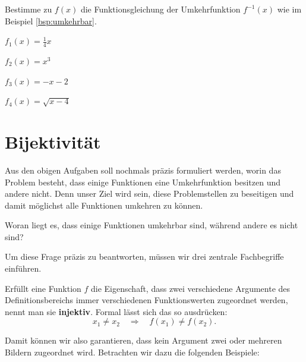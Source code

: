 \documentclass[11pt,oneside]{article}
\begin{document}
	\begin{aufgabe}
		Bestimme zu $f(x)$ die Funktionsgleichung der Umkehrfunktion $f^{-1}(x)$ wie im Beispiel \ref{bsp:umkehrbar}.
		\begin{enumcols}[2]
			\item $f_1(x)=\frac{1}{4}x$
			\item $f_2(x)=x^3$
			\item $f_3(x)=-x-2$
			\item $f_4(x)=\sqrt{x-4}$
		\end{enumcols}
	\end{aufgabe}


\newpage
\section{Bijektivität}
	Aus den obigen Aufgaben soll nochmals präzis formuliert werden, worin das Problem besteht, dass einige Funktionen eine Umkehrfunktion besitzen und andere nicht. Denn unser Ziel wird sein, diese Problemstellen zu beseitigen und damit möglichst alle Funktionen umkehren zu können.
	\begin{aufgabe}
		Woran liegt es, dass einige Funktionen umkehrbar sind, während andere es nicht sind?\vspace*{5pt}\newline\karos{3.5}
	\end{aufgabe}
	Um diese Frage präzis zu beantworten, müssen wir drei zentrale Fachbegriffe einführen.
	\begin{definition}
		Erfüllt eine Funktion $f$ die Eigenschaft, dass zwei verschiedene Argumente des Definitionsbereichs immer verschiedenen Funktionswerten zugeordnet werden, nennt man sie \textbf{injektiv}. Formal lässt sich das so ausdrücken:
		\[x_1\neq x_2 \quad\Rightarrow\quad f(x_1)\neq f(x_2).\]
	\end{definition}
	Damit können wir also garantieren, dass kein Argument zwei oder mehreren Bildern zugeordnet wird. Betrachten wir dazu die folgenden Beispiele:
\end{document}
